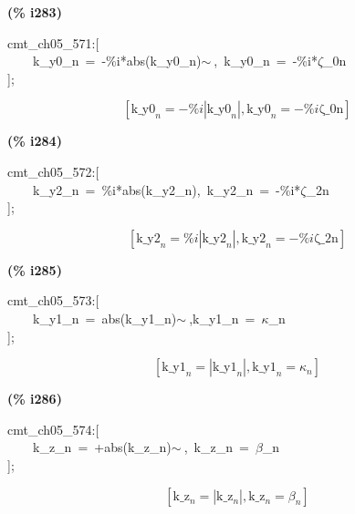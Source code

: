 \documentclass[fleqn]{article}
\begin{document}
\noindent
\begin{minipage}[t]{4.000000em}\color{red}\bfseries
(\% i283)	
\end{minipage}
\begin{minipage}[t]{\textwidth}\color{blue}
cmt\_ch05\_571:[\\
\ \ \ \ k\_y0\_n\ =\ -\%i*abs(k\_y0\_n)\ensuremath{\sim\ },\ k\_y0\_n\ =\ -\%i*\ensuremath{\zeta}\_0n\\
];
\end{minipage}
\[\displaystyle \tag{\% o283} 
\left[ {{\ensuremath{\mathrm{k\_ y0}}}_n}=-\% i \left| {{\ensuremath{\mathrm{k\_ y0}}}_n}\right| \operatorname{,}{{\ensuremath{\mathrm{k\_ y0}}}_n}=-\% i \ensuremath{\mathrm{\zeta \_ 0n}}\right] \mbox{}
\]


\noindent
\begin{minipage}[t]{4.000000em}\color{red}\bfseries
(\% i284)	
\end{minipage}
\begin{minipage}[t]{\textwidth}\color{blue}
cmt\_ch05\_572:[\\
\ \ \ \ k\_y2\_n\ =\ \%i*abs(k\_y2\_n),\ k\_y2\_n\ =\ -\%i*\ensuremath{\zeta}\_2n\\
];
\end{minipage}
\[\displaystyle \tag{\% o284} 
\left[ {{\ensuremath{\mathrm{k\_ y2}}}_n}=\% i \left| {{\ensuremath{\mathrm{k\_ y2}}}_n}\right| \operatorname{,}{{\ensuremath{\mathrm{k\_ y2}}}_n}=-\% i \ensuremath{\mathrm{\zeta \_ 2n}}\right] \mbox{}
\]


\noindent
\begin{minipage}[t]{4.000000em}\color{red}\bfseries
(\% i285)	
\end{minipage}
\begin{minipage}[t]{\textwidth}\color{blue}
cmt\_ch05\_573:[\\
\ \ \ \ k\_y1\_n\ =\ abs(k\_y1\_n)\ensuremath{\sim\ },k\_y1\_n\ =\ \ensuremath{\kappa}\_n\\
];
\end{minipage}
\[\displaystyle \tag{\% o285} 
\left[ {{\ensuremath{\mathrm{k\_ y1}}}_n}=\left| {{\ensuremath{\mathrm{k\_ y1}}}_n}\right| \operatorname{,}{{\ensuremath{\mathrm{k\_ y1}}}_n}={{\kappa }_n}\right] \mbox{}
\]


\noindent
\begin{minipage}[t]{4.000000em}\color{red}\bfseries
(\% i286)	
\end{minipage}
\begin{minipage}[t]{\textwidth}\color{blue}
cmt\_ch05\_574:[\\
\ \ \ \ k\_z\_n\ =\ +abs(k\_z\_n)\ensuremath{\sim\ },\ k\_z\_n\ =\ \ensuremath{\beta}\_n\\
];
\end{minipage}
\[\displaystyle \tag{\% o286} 
\left[ {{\ensuremath{\mathrm{k\_ z}}}_n}=\left| {{\ensuremath{\mathrm{k\_ z}}}_n}\right| \operatorname{,}{{\ensuremath{\mathrm{k\_ z}}}_n}={{\beta }_n}\right] \mbox{}
\]
\end{document}

